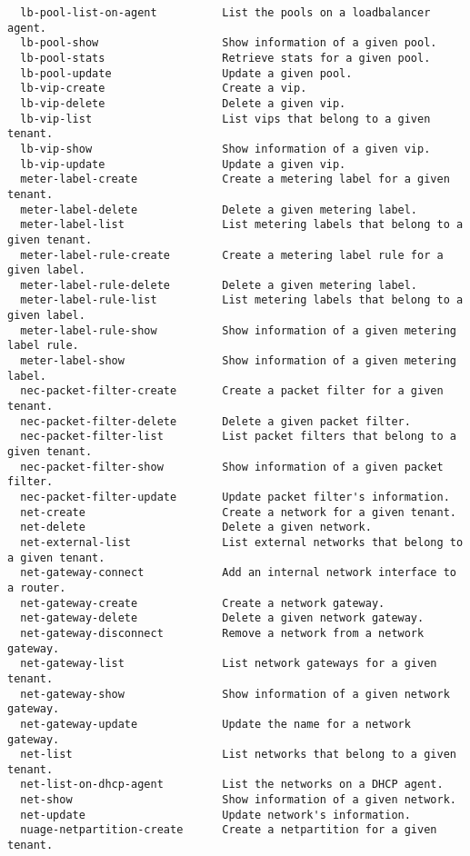 \documentclass[a4paper,left=1.5cm,right=1.5cm,11pt]{article}
\begin{document}
\begin{lstlisting}
  lb-pool-list-on-agent          List the pools on a loadbalancer agent.
  lb-pool-show                   Show information of a given pool.
  lb-pool-stats                  Retrieve stats for a given pool.
  lb-pool-update                 Update a given pool.
  lb-vip-create                  Create a vip.
  lb-vip-delete                  Delete a given vip.
  lb-vip-list                    List vips that belong to a given tenant.
  lb-vip-show                    Show information of a given vip.
  lb-vip-update                  Update a given vip.
  meter-label-create             Create a metering label for a given tenant.
  meter-label-delete             Delete a given metering label.
  meter-label-list               List metering labels that belong to a given tenant.
  meter-label-rule-create        Create a metering label rule for a given label.
  meter-label-rule-delete        Delete a given metering label.
  meter-label-rule-list          List metering labels that belong to a given label.
  meter-label-rule-show          Show information of a given metering label rule.
  meter-label-show               Show information of a given metering label.
  nec-packet-filter-create       Create a packet filter for a given tenant.
  nec-packet-filter-delete       Delete a given packet filter.
  nec-packet-filter-list         List packet filters that belong to a given tenant.
  nec-packet-filter-show         Show information of a given packet filter.
  nec-packet-filter-update       Update packet filter's information.
  net-create                     Create a network for a given tenant.
  net-delete                     Delete a given network.
  net-external-list              List external networks that belong to a given tenant.
  net-gateway-connect            Add an internal network interface to a router.
  net-gateway-create             Create a network gateway.
  net-gateway-delete             Delete a given network gateway.
  net-gateway-disconnect         Remove a network from a network gateway.
  net-gateway-list               List network gateways for a given tenant.
  net-gateway-show               Show information of a given network gateway.
  net-gateway-update             Update the name for a network gateway.
  net-list                       List networks that belong to a given tenant.
  net-list-on-dhcp-agent         List the networks on a DHCP agent.
  net-show                       Show information of a given network.
  net-update                     Update network's information.
  nuage-netpartition-create      Create a netpartition for a given tenant.

\end{lstlisting}
\end{document}
